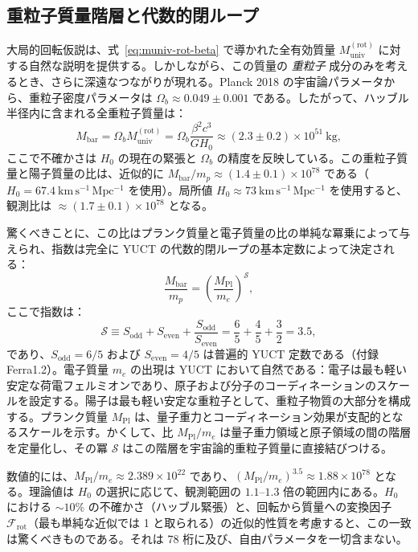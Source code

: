 \documentclass[11pt,a4paper]{article}
\newcommand{\Sodd}{S_{\mathrm{odd}}}
\newcommand{\Seven}{S_{\mathrm{even}}}
\begin{document}
	\subsection{重粒子質量階層と代数的閉ループ}
	\label{subsec:baryon-hierarchy}
	
	大局的回転仮説は、式~\eqref{eq:muniv-rot-beta} で導かれた全有効質量 \(M_{\mathrm{univ}}^{\mathrm{(rot)}}\) に対する自然な説明を提供する。しかしながら、この質量の \emph{重粒子} 成分のみを考えるとき、さらに深遠なつながりが現れる。Planck 2018 の宇宙論パラメータから、重粒子密度パラメータは \(\Omega_b \approx 0.049 \pm 0.001\) である。したがって、ハッブル半径内に含まれる全重粒子質量は：
	\begin{equation}
		M_{\mathrm{bar}} = \Omega_b M_{\mathrm{univ}}^{\mathrm{(rot)}} = \Omega_b \frac{\beta^2 c^3}{G H_0} \approx (2.3 \pm 0.2) \times 10^{51}\ \mathrm{kg},
	\end{equation}
	ここで不確かさは \(H_0\) の現在の緊張と \(\Omega_b\) の精度を反映している。この重粒子質量と陽子質量の比は、近似的に \(M_{\mathrm{bar}}/m_p \approx (1.4 \pm 0.1) \times 10^{78}\) である（\(H_0 = 67.4\ \mathrm{km\,s^{-1}\,Mpc^{-1}}\) を使用）。局所値 \(H_0 \approx 73\ \mathrm{km\,s^{-1}\,Mpc^{-1}}\) を使用すると、観測比は \(\approx (1.7 \pm 0.1) \times 10^{78}\) となる。
	
	驚くべきことに、この比はプランク質量と電子質量の比の単純な冪乗によって与えられ、指数は完全に YUCT の代数的閉ループの基本定数によって決定される：
	\begin{equation}
		\boxed{ \frac{M_{\mathrm{bar}}}{m_p} = \left( \frac{M_{\mathrm{Pl}}}{m_e} \right)^{\mathcal{S}} },
		\label{eq:baryon-hierarchy}
	\end{equation}
	ここで指数は：
	\begin{equation}
		\mathcal{S} \equiv \Sodd + \Seven + \frac{\Sodd}{\Seven} = \frac{6}{5} + \frac{4}{5} + \frac{3}{2} = 3.5,
	\end{equation}
	であり、\(\Sodd = 6/5\) および \(\Seven = 4/5\) は普遍的 YUCT 定数である（付録 Ferra1.2）。電子質量 \(m_e\) の出現は YUCT において自然である：電子は最も軽い安定な荷電フェルミオンであり、原子および分子のコーディネーションのスケールを設定する。陽子は最も軽い安定な重粒子として、重粒子物質の大部分を構成する。プランク質量 \(M_{\mathrm{Pl}}\) は、量子重力とコーディネーション効果が支配的となるスケールを示す。かくして、比 \(M_{\mathrm{Pl}}/m_e\) は量子重力領域と原子領域の間の階層を定量化し、その冪 \(\mathcal{S}\) はこの階層を宇宙論的重粒子質量に直接結びつける。
	
	数値的には、\(M_{\mathrm{Pl}}/m_e \approx 2.389 \times 10^{22}\) であり、\((M_{\mathrm{Pl}}/m_e)^{3.5} \approx 1.88 \times 10^{78}\) となる。理論値は \(H_0\) の選択に応じて、観測範囲の \(1.1\)--\(1.3\) 倍の範囲内にある。\(H_0\) における \(\sim 10\%\) の不確かさ（ハッブル緊張）と、回転から質量への変換因子 \(\mathcal{F}_{\mathrm{rot}}\)（最も単純な近似では 1 と取られる）の近似的性質を考慮すると、この一致は驚くべきものである。それは 78 桁に及び、自由パラメータを一切含まない。
	
\end{document}
